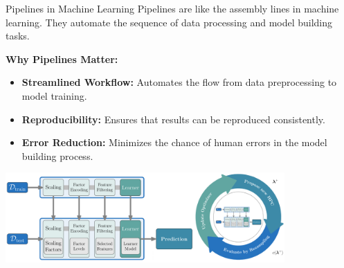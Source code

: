 \documentclass[11pt,compress,t,notes=noshow, xcolor=table]{beamer}
\begin{document}
\begin{vbframe}{Pipelines in Machine Learning}
Pipelines are like the assembly lines in machine learning. They automate the sequence of data processing and model building tasks.
\vspace{1em}

\textbf{Why Pipelines Matter:}
\begin{itemize}
\item \small \textbf{Streamlined Workflow:} Automates the flow from data preprocessing to model training.
\item \small \textbf{Reproducibility:} Ensures that results can be reproduced consistently.
\item \small \textbf{Error Reduction:} Minimizes the chance of human errors in the model building process.
\end{itemize}

\begin{center}
\includegraphics[width = 0.8\textwidth]{figure_man/linear_pipeline.png}
\end{center}

\end{vbframe}



\endlecture
\end{document}
